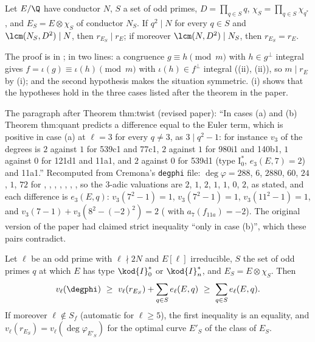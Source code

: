 \begin{theorem}\label{thm:modgalrep:twist-monotonicity}
Let $E/\Q$ have conductor $N$, $S$ a set of odd primes, $D=\prod_{q\in S}q$, $\chi_S=\prod_{q\in S}\chi_{q^*}$, and $E_S=E\otimes\chi_S$ of conductor $N_S$. If $q^2\mid N$ for every $q\in S$ and
$\lcm(N_S,D^2)\mid N$, then $r_{E_S}\mid r_E$; if moreover $\lcm(N,D^2)\mid N_S$, then $r_{E_S}=r_E$.
\end{theorem}

The proof is in ; in two lines: a congruence $g\equiv h\pmod m$ with $h\in g^\perp$ integral gives $f=\iota(g)\equiv\iota(h)\pmod m$ with $\iota(h)\in f^\perp$ integral
((ii), (ii)), so $m\mid r_E$ by (i); and the second hypothesis makes the situation
symmetric. (i) shows that the hypotheses hold in the three cases listed after the theorem in the paper.

\begin{paperlink}
The paragraph after Theorem thm:twist (revised paper): ``In cases (a) and (b) Theorem thm:quant predicts a difference equal to the Euler term, which is positive in
case (a) at $\ell=3$ for every $q\ne3$, as $3\mid q^2-1$: for instance $v_3$ of the degrees is $2$ against $1$ for 539c1 and 77c1, $2$ against $1$ for 980i1 and 140b1, $1$ against
$0$ for 121d1 and 11a1, and $2$ against $0$ for 539d1 (type $\mathrm{I}_0^*$, $e_3(E,7)=2$) and 11a1.'' Recomputed from Cremona's \texttt{degphi} file: $\deg\varphi=288$, $6$, $2880$, $60$,
$24$, $1$, $72$ for , , , , , , , so the $3$-adic valuations are $2$, $1$, $2$, $1$, $1$, $0$, $2$, as stated, and each difference
is $e_3(E,q)$: $v_3(7^2-1)=1$, $v_3(7^2-1)=1$, $v_3(11^2-1)=1$, and $v_3(7-1)+v_3(8^2-(-2)^2)=2$ ( with $a_7(f_{11a})=-2$). The original version
of the paper had claimed strict inequality ``only in case (b)'', which these pairs contradict.
\end{paperlink}

\begin{theorem}\label{thm:modgalrep:quant}
Let $\ell$ be an odd prime with $\ell\nmid2N$ and $E[\ell]$ irreducible, $S$ the set of odd primes $q$ at which $E$ has type $\kod{I}_0^*$ or $\kod{I}_n^*$, and $E_S=E\otimes\chi_S$. Then
\[
v_\ell(\degphi)\ \ge\ v_\ell(r_{E_S})+\sum_{q\in S}e_\ell(E,q)\ \ge\ \sum_{q\in S}e_\ell(E,q).
\]
If moreover $\ell\notin S_f$ (automatic for $\ell\ge5$), the first inequality is an equality, and $v_\ell(r_{E_S})=v_\ell(\deg\varphi_{E'_S})$ for the optimal curve $E'_S$ of the class of
$E_S$.
\end{theorem}

